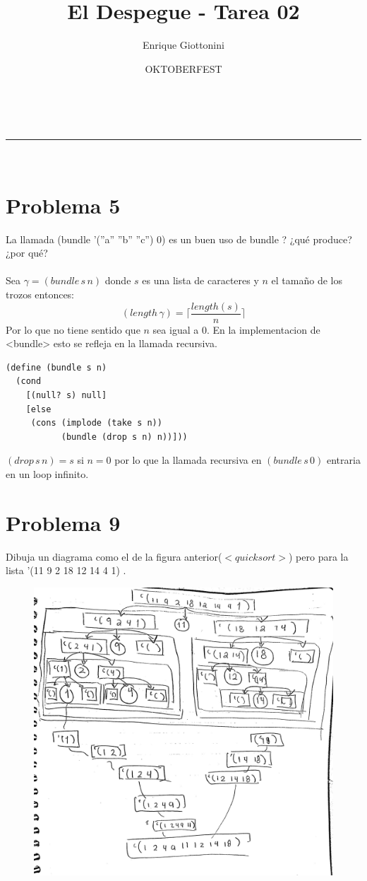 \documentclass[a4paper,11pt]{article}
\makeatletter
\newcommand{\linia}{\rule{\linewidth}{0.5pt}}
\theoremstyle{mytheor}
\renewcommand{\maketitle}{
\begin{center}
\vspace{2ex}
{\huge \textsc{\@title}}
\vspace{1ex}
\\
\linia\\
\@author \hfill \@date
\vspace{4ex}
\end{center}
}
\makeatother
\begin{document}
\title{El Despegue - Tarea \textnumero{} 02}

\author{Enrique Giottonini}

\date{OKTOBERFEST}

\maketitle

\section*{Problema 5}
La llamada (bundle ’(”a” ”b” ”c”) 0) es un buen uso de bundle ? ¿qué produce?
¿por qué? \\ \\
Sea $\gamma = (bundle\, s\, n)$ donde $s$ es una lista de caracteres y $n$ el tamaño de los trozos entonces:
\[ (length\,\gamma) = \Big \lceil \dfrac{length(s)}{n}\Big \rceil\]
Por lo que no tiene sentido que $n$ sea igual a 0. En la implementacion de <bundle> esto se refleja en la llamada recursiva.

\begin{lstlisting}[title=bundle]
(define (bundle s n)
  (cond
    [(null? s) null]
    [else
     (cons (implode (take s n))
           (bundle (drop s n) n))]))
\end{lstlisting}

$(drop \,s \,n) = s$ si $n=0$ por lo que la llamada recursiva  en $(bundle\, s\, 0)$ entraria en un loop infinito.
\newpage
\section*{Problema 9}
Dibuja un diagrama como el de la figura anterior($<quicksort>$) pero para la lista ’(11 9 2 18 12
14 4 1) .

\begin{figure}[ht]
\includegraphics[width=15cm]{img}
\centering
\end{figure}
\end{document}
